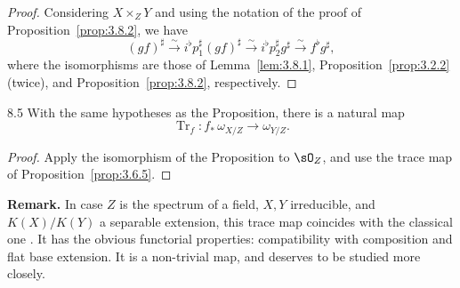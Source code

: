 \begin{proof}
Considering $X\times_Z Y$ and using the notation of the proof of Proposition~\ref{prop:3.8.2}, we have
\[
(gf)^{\sharp} \xrightarrow{\sim} i^{\flat} p_1^{\sharp} (gf)^{\sharp} \xrightarrow{\sim} i^{\flat} p_2^{\sharp} g^{\sharp} \xrightarrow{\sim} f^{\flat} g^{\sharp},
\]
where the isomorphisms are those of Lemma~\ref{lem:3.8.1}, Proposition~\ref{prop:3.2.2} (twice), and Proposition~\ref{prop:3.8.2}, respectively.
\end{proof}

\begin{bookcorollary}{8.5}\label{cor:3.8.5}
With the same hypotheses as the Proposition, there is a natural map
\[
\operatorname{Tr}_f \colon f_*\,\omega_{X/Z} \longrightarrow \omega_{Y/Z}.
\]
\end{bookcorollary}

\begin{proof}
Apply the isomorphism of the Proposition to $\sO_Z$, and use the trace map of Proposition~\ref{prop:3.6.5}.
\end{proof}

\textbf{Remark.}
In case $Z$ is the spectrum of a field, $X,Y$ irreducible, and $K(X)/K(Y)$ a separable extension, this trace map coincides with the classical one \cite[\nopp Ch.~VI, \S2]{3}. It has the obvious functorial properties: compatibility with composition and flat base extension. It is a non-trivial map, and deserves to be studied more closely.

